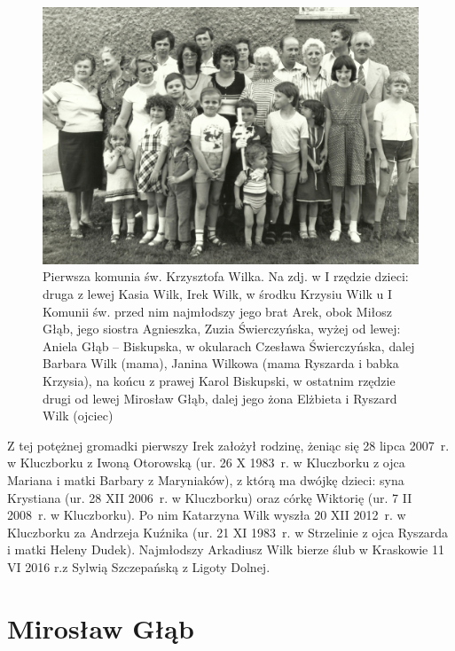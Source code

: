 \begin{figure}[!h]
\begin{center}
\includegraphics[width=\textwidth]{zdjecia/komunia_krzysztofa_wilka.jpg}
\caption[Pierwsza komunia św. Krzysztofa Wilka]{Pierwsza komunia św. Krzysztofa Wilka. Na zdj. w I rzędzie dzieci: druga z lewej Kasia Wilk, Irek Wilk, w środku Krzysiu Wilk u I Komunii św. przed nim najmłodszy jego brat Arek, obok Miłosz Głąb, jego siostra Agnieszka, Zuzia Świerczyńska, wyżej od lewej: Aniela Głąb -- Biskupska, w okularach Czesława Świerczyńska, dalej Barbara Wilk (mama), Janina Wilkowa (mama Ryszarda i babka Krzysia), na końcu z prawej Karol Biskupski, w ostatnim rzędzie drugi od lewej Mirosław Głąb, dalej jego żona Elżbieta i Ryszard Wilk (ojciec)}
\label{rys:komunia_krzysztofa_wilka}
\end{center}
\end{figure}


Z tej potężnej gromadki pierwszy Irek założył rodzinę, żeniąc się 28 lipca 2007~r. w Kluczborku z Iwoną Otorowską (ur. 26 X 1983~r. w Kluczborku z ojca Mariana i matki Barbary z Maryniaków), z którą ma dwójkę dzieci: syna Krystiana (ur. 28 XII 2006~r. w Kluczborku) oraz córkę Wiktorię (ur. 7 II 2008~r. w Kluczborku). Po nim Katarzyna Wilk wyszła 20 XII 2012~r. w Kluczborku za Andrzeja Kuźnika (ur. 21 XI 1983~r. w Strzelinie z ojca Ryszarda i matki Heleny Dudek). Najmłodszy Arkadiusz Wilk bierze ślub w Kraskowie 11 VI 2016 r.z Sylwią Szczepańską z Ligoty Dolnej.





\section{Mirosław Głąb}

